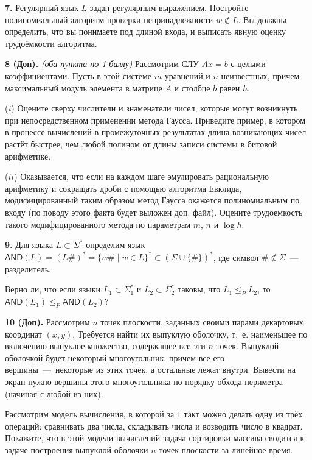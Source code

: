 \documentclass[12pt,a5paper,fleqn]{article}
\begin{document}
\smallskip

{\bf 7.} Регулярный язык $L$ задан регулярным выражением. Постройте полиномиальный алгоритм проверки непринадлежности $w\notin L$. Вы должны определить, что вы понимаете под длиной входа, и выписать явную  оценку трудоёмкости алгоритма.

\smallskip

{\bf 8 (Доп).} \textit{(оба пункта по 1 баллу)} Рассмотрим СЛУ $Ax=b$ с целыми коэффициентами. Пусть в этой системе $m$ уравнений и $n$ неизвестных, причем максимальный модуль элемента в матрице $A$ и столбце $b$ равен $h$. 

($i$) Оцените сверху числители и знаменатели чисел, которые могут возникнуть при непосредственном применении метода Гаусса. Приведите пример, в котором в процессе вычислений в промежуточных результатах длина возникающих чисел растёт быстрее, чем любой полином от длины записи системы в битовой арифметике.

($ii$) Оказывается, что если на каждом шаге эмулировать рациональную арифметику и сокращать дроби с помощью алгоритма Евклида, модифицированный таким образом метод Гаусса окажется полиномиальным по входу (по поводу этого факта будет выложен доп. файл). Оцените трудоемкость такого модифицированного метода по параметрам $m$, $n$ и $\log h$.

\smallskip

{\bf 9.} Для языка $L \subset \Sigma^*$ определим язык $\mathsf{AND}(L) = (L\#)^* = \{w\# \mid w \in L\}^* \subset (\Sigma \cup \{\#\})^*$, где символ $\# \notin \Sigma$~--- разделитель. 

Верно ли, что если языки $L_1 \subset \Sigma_1^*$ и $L_2 \subset \Sigma_2^*$ таковы, что $L_1 \le_P L_2$, то $\mathsf{AND}(L_1) \le_P \mathsf{AND}(L_2)$?


\smallskip

{\bf 10 (Доп).} Рассмотрим $n$ точек плоскости, заданных своими парами декартовых координат $(x, y)$. Требуется найти их выпуклую оболочку, т.~е. наименьшее по включению выпуклое множество, содержащее все эти $n$ точек. Выпуклой оболочкой будет некоторый многоугольник, причем все его вершины~---~некоторые из этих точек, а остальные лежат внутри. Вывести на экран нужно вершины этого многоугольника по порядку обхода периметра (начиная с любой из них).

Рассмотрим модель вычисления, в которой за $1$ такт можно делать одну из трёх операций: сравнивать два числа, складывать числа и возводить число в квадрат. Покажите, что в этой модели вычислений задача сортировки массива сводится к задаче построения выпуклой оболочки $n$ точек плоскости за линейное время.

\smallskip
\end{document}
